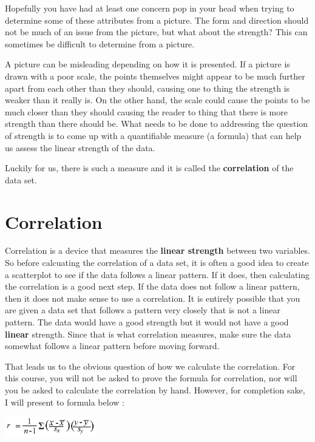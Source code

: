 \documentclass[
  letterpaper,
  DIV=11,
  numbers=noendperiod]{scrreprt}
\begin{document}
Hopefully you have had at least one concern pop in your head when trying
to determine some of these attributes from a picture. The form and
direction should not be much of an issue from the picture, but what
about the strength? This can sometimes be difficult to determine from a
picture.

A picture can be misleading depending on how it is presented. If a
picture is drawn with a poor scale, the points themselves might appear
to be much further apart from each other than they should, causing one
to thing the strength is weaker than it really is. On the other hand,
the scale could cause the points to be much closer than they should
causing the reader to thing that there is more strength than there
should be. What needs to be done to addressing the question of strength
is to come up with a quantifiable measure (a formula) that can help us
assess the linear strength of the data.

Luckily for us, there is such a measure and it is called the
\textbf{correlation} of the data set.

\section*{Correlation}\label{correlation}


Correlation is a device that measures the \textbf{linear strength}
between two variables. So before calcuating the correlation of a data
set, it is often a good idea to create a scatterplot to see if the data
follows a linear pattern. If it does, then calculating the correlation
is a good next step. If the data does not follow a linear pattern, then
it does not make sense to use a correlation. It is entirely possible
that you are given a data set that follows a pattern very closely that
is not a linear pattern. The data would have a good strength but it
would not have a good \textbf{linear} strength. Since that is what
correlation measures, make sure the data somewhat follows a linear
pattern before moving forward.

That leads us to the obvious question of how we calculate the
correlation. For this course, you will not be asked to prove the formula
for correlation, nor will you be asked to calculate the correlation by
hand. However, for completion sake, I will present to formula below :

\includegraphics[width=0.3\textwidth,height=\textheight]{./images/SC_7.jpg}
\end{document}
